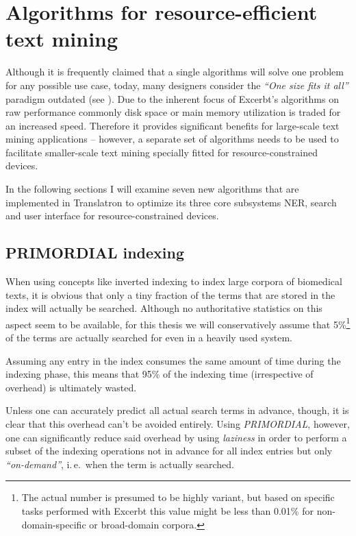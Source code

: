 \documentclass[a4paper, 12pt, twoside, reqn]{report}
\numberwithin{figure}{chapter}
\newtheorem[L]{boxedDefinition}{Definition}
\newtheorem[L]{boxedExample}{Example}
\newcommand{\ie}{i.\,e.\ }
\newcommand{\itquote}[1]{\textit{{``}#1{''}}}
\begin{document}
\section{Algorithms for resource-efficient text mining}

Although it is frequently claimed that a single algorithms will solve one problem for any possible use case, today, many designers consider the \itquote{One size fits it all} paradigm outdated (see \cite{stonebraker2005one}). Due to the inherent focus of Excerbt's algorithms on raw performance commonly disk space or main memory utilization is traded for an increased speed. Therefore it provides significant benefits for large-scale text mining applications -- however, a separate set of algorithms needs to be used to facilitate smaller-scale text mining specially fitted for resource-constrained devices.

In the following sections I will examine seven new algorithms that are implemented in Translatron to optimize its three core subsystems NER, search and user interface for resource-constrained devices.

\subsection{PRIMORDIAL indexing}\label{sec:primordial}

When using concepts like inverted indexing to index large corpora of biomedical texts, it is obvious that only a tiny fraction of the terms that are stored in the index will actually be searched. Although no authoritative statistics on this aspect seem to be available, for this thesis we will conservatively assume that 5\%\footnote{The actual number is presumed to be highly variant, but based on specific tasks performed with Excerbt this value might be less than 0.01\% for non-domain-specific or broad-domain corpora.} of the terms are actually searched for even in a heavily used system.

Assuming any entry in the index consumes the same amount of time during the indexing phase, this means that 95\% of the indexing time (irrespective of overhead) is ultimately wasted.

Unless one can accurately predict all actual search terms in advance, though, it is clear that this overhead can't be avoided entirely. Using \textit{PRIMORDIAL}, however, one can significantly reduce said overhead by using \textit{laziness} in order to perform a subset of the indexing operations not in advance for all index entries but only \itquote{on-demand}, \ie when the term is actually searched.
\end{document}

